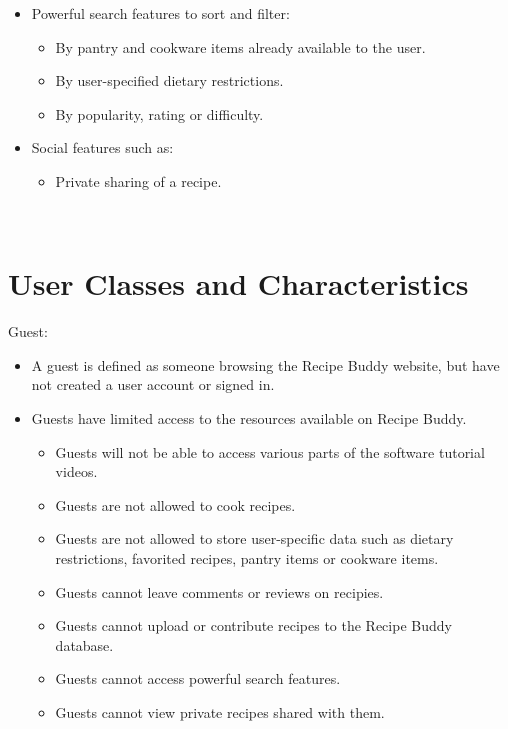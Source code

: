 \documentclass{scrreprt}
\begin{document}
\begin{itemize}
\begin{itemize}
          \end{itemize}
    \item Powerful search features to sort and filter:
          \begin{itemize}
              \item By pantry and cookware items already available to the user.
              \item By user-specified dietary restrictions.
              \item By popularity, rating or difficulty.
          \end{itemize}
    \item Social features such as:
          \begin{itemize}
              \item Private sharing of a recipe.
          \end{itemize}
\end{itemize}
$ $

\section{User Classes and Characteristics}
Guest:
\begin{itemize}
    \item A guest is defined as someone browsing the Recipe Buddy website, but have not created a user account or signed in.
    \item Guests have limited access to the resources available on Recipe Buddy.
          \begin{itemize}
              \item Guests will not be able to access various parts of the software tutorial videos.
              \item Guests are not allowed to cook recipes.
              \item Guests are not allowed to store user-specific data such as dietary restrictions, favorited recipes, pantry items or cookware items.
              \item Guests cannot leave comments or reviews on recipies.
              \item Guests cannot upload or contribute recipes to the Recipe Buddy database.
              \item Guests cannot access powerful search features.
              \item Guests cannot view private recipes shared with them.
          \end{itemize}
\end{itemize}
\end{document}
